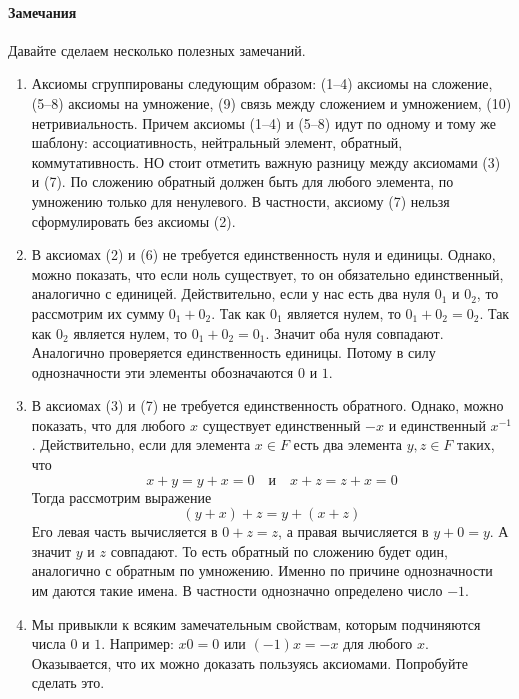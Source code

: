 \paragraph{Замечания}

Давайте сделаем несколько полезных замечаний.
\begin{enumerate}
\item Аксиомы сгруппированы следующим образом: (1--4) аксиомы на сложение, (5--8) аксиомы на умножение, (9) связь между сложением и умножением, (10) нетривиальность.
Причем аксиомы (1--4) и (5--8) идут по одному и тому же шаблону: ассоциативность, нейтральный элемент, обратный, коммутативность.
НО стоит отметить важную разницу между аксиомами (3) и (7).
По сложению обратный должен быть для любого элемента, по умножению только для ненулевого.
В частности, аксиому (7) нельзя сформулировать без аксиомы (2).

\item В аксиомах (2) и (6) не требуется единственность нуля и единицы.
Однако, можно показать, что если ноль существует, то он обязательно единственный, аналогично с единицей.
Действительно, если у нас есть два нуля $0_1$ и $0_2$, то рассмотрим их сумму $0_1 + 0_2$.
Так как $0_1$ является нулем, то $0_1 + 0_2 = 0_2$.
Так как $0_2$ является нулем, то $0_1 + 0_2 = 0_1$.
Значит оба нуля совпадают.
Аналогично проверяется единственность единицы.
Потому в силу однозначности эти элементы обозначаются $0$ и $1$.

\item В аксиомах (3) и (7) не требуется единственность обратного.
Однако, можно показать, что для любого $x$ существует единственный $-x$ и единственный $x^{-1}$.
Действительно, если для элемента $x\in F$ есть два элемента $y,z\in F$ таких, что
\[
x + y = y + x = 0\quad\text{и}\quad x + z = z + x = 0
\]
Тогда рассмотрим выражение
\[
(y + x) + z = y + (x + z)
\]
Его левая часть вычисляется в $0 + z = z$, а правая вычисляется в $y + 0  = y$.
А значит $y$ и $z$ совпадают.
То есть обратный по сложению будет один, аналогично с обратным по умножению.
Именно по причине однозначности им даются такие имена.
В частности однозначно определено число $-1$.

\item Мы привыкли к всяким замечательным свойствам, которым подчиняются числа $0$ и $1$.
Например: $x 0 = 0$ или $(-1)x = -x$ для любого $x$.
Оказывается, что их можно доказать пользуясь аксиомами.
Попробуйте сделать это.


\end{enumerate}
